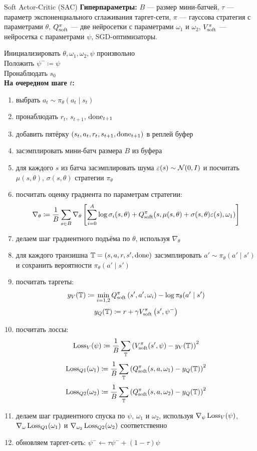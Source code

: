 \begin{algorithm}[label = SACalgorithm]{Soft Actor-Critic (SAC)}
\textbf{Гиперпараметры:} $B$ --- размер мини-батчей, $\tau$ --- параметр экспоненциального сглаживания таргет-сети, $\pi$ --- гауссова стратегия с параметрами $\theta$, $Q^\pi_{\mathrm{soft}}$ --- две нейросетки с параметрами $\omega_1$ и $\omega_2$, $V^\pi_{\mathrm{soft}}$ --- нейросетка с параметрами $\psi$, SGD-оптимизаторы.

\vspace{0.3cm}
Инициализировать $\theta, \omega_1, \omega_2, \psi$ произвольно \\
Положить $\psi^- \coloneqq \psi$ \\
Пронаблюдать $s_0$ \\
\textbf{На очередном шаге $t$:}
\begin{enumerate}
    \item выбрать $a_t \sim \pi_\theta(a_t \mid s_t)$
    \item пронаблюдать $r_t$,  $s_{t+1}$, $\mathrm{done}_{t+1}$
    \item добавить пятёрку $(s_t, a_t, r_t, s_{t+1}, \mathrm{done}_{t+1})$ в реплей буфер
    \item засэмплировать мини-батч размера $B$ из буфера
    \item для каждого $s$ из батча засэмплировать шума $\varepsilon(s) \sim \mathcal{N}(0, I)$ и посчитать $\mu(s, \theta)$, $\sigma(s, \theta)$ стратегии $\pi_\theta$
    \item посчитать оценку градиента по параметрам стратегии:
    $$\nabla_\theta \coloneqq \frac{1}{B}\sum_{s \in B} \nabla_\theta \left[ \sum_{i=0}^A \log \sigma_i(s, \theta) + Q^\pi_{\mathrm{soft}}(s, \mu(s, \theta) + \sigma(s, \theta) \varepsilon(s), \omega_1) \right]$$
    \item делаем шаг градиентного подъёма по $\theta$, используя $\nabla_\theta$
    \item для каждого транзишна $\mathbb{T} = (s, a, r, s', \mathrm{done})$ засэмплировать $a' \sim \pi_\theta(a' \mid s')$ и сохранить вероятности $\pi_\theta(a' \mid s')$
    \item посчитать таргеты:
    $$y_V(\mathbb{T} ) \coloneqq \min_{i = 1, 2} Q^\pi_{\mathrm{soft}}\left( s', a', \omega_i \right) - \log \pi_\theta(a' \mid s')$$
    $$y_Q(\mathbb{T} ) \coloneqq r + \gamma V^\pi_{\mathrm{soft}}\left( s', \psi^{-} \right)$$
    \item посчитать лоссы:
    $$\operatorname{Loss}_V(\psi) \coloneqq \frac{1}{B}\sum_{\mathbb{T}} \left( V^\pi_{\mathrm{soft}}(s', \psi) - y_V(\mathbb{T} ) \right) ^2$$
    $$\operatorname{Loss}_{Q1}(\omega_1) \coloneqq \frac{1}{B}\sum_{\mathbb{T}} \left( Q^\pi_{\mathrm{soft}}(s, a, \omega_1) - y_Q(\mathbb{T} ) \right) ^2$$
    $$\operatorname{Loss}_{Q2}(\omega_2) \coloneqq \frac{1}{B}\sum_{\mathbb{T}} \left( Q^\pi_{\mathrm{soft}}(s, a, \omega_2) - y_Q(\mathbb{T} ) \right) ^2$$
    \item делаем шаг градиентного спуска по $\psi$, $\omega_1$ и $\omega_2$, используя $\nabla_\psi \operatorname{Loss}_V(\psi)$, $\nabla_\omega \operatorname{Loss}_{Q1}(\omega_1)$ и $\nabla_{\omega_2} \operatorname{Loss}_{Q2}(\omega_2)$ соответственно
    \item обновляем таргет-сеть: $\psi^{-} \leftarrow \tau \psi^{-} + (1 - \tau) \psi$
\end{enumerate}
\end{algorithm}
